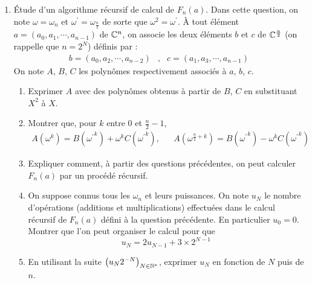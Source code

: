 \begin{enumerate}
\item \'Etude d'un algorithme récursif de calcul de $F_n(a)$.\newline
Dans cette question, on note $\omega=\omega_n$ et $\omega^\prime = \omega_{\frac{n}{2}}$ de sorte que $\omega^2 = \omega^\prime$.\newline
\`A tout élément $a=(a_0,a_1,\cdots,a_{n-1})$ de $\mathbb{C}^n$, on associe les deux éléments $b$ et $c$ de $\mathbb{C}^{\frac{n}{2}}$ (on rappelle que $n=2^N$) définis par :
\begin{align*}
 b=(a_0,a_2,\cdots, a_{n-2}) &,& c=(a_1,a_3,\cdots, a_{n-1})
\end{align*}
On note $A$, $B$, $C$ les polynômes respectivement associés à $a$, $b$, $c$.
\begin{enumerate}
 \item Exprimer $A$ avec des polynômes obtenus à partir de $B$, $C$ en substituant $X^2$ à $X$.
 \item Montrer que, pour $k$ entre 0 et $\frac{n}{2}-1$,
\begin{align*}
 A(\omega^k) = B({\omega^\prime}^k) + \omega^k C({\omega^\prime}^k), & &
 A(\omega^{\frac{n}{2}+k}) = B({\omega^\prime}^k) - \omega^k C({\omega^\prime}^k)
\end{align*}
 \item Expliquer comment, à partir des questions précédentes, on peut calculer $F_n(a)$ par un procédé récursif.
 \item On suppose connus tous les $\omega_n$ et leurs puissances. On note $u_N$ le nombre d'opérations (additions et multiplications) effectuées dans le calcul récursif de $F_n(a)$ défini à la question précédente. En particulier $u_0=0$. Montrer que l'on peut organiser le calcul pour que 
\begin{displaymath}
 u_N = 2u_{N-1}+3\times 2^{N-1}
\end{displaymath}
\item En utilisant la suite $\left( u_N 2^{-N}\right)_{N\in\mathbb{N}^*}$, exprimer $u_N$ en fonction de $N$ puis de $n$. 
\end{enumerate}



\end{enumerate}
